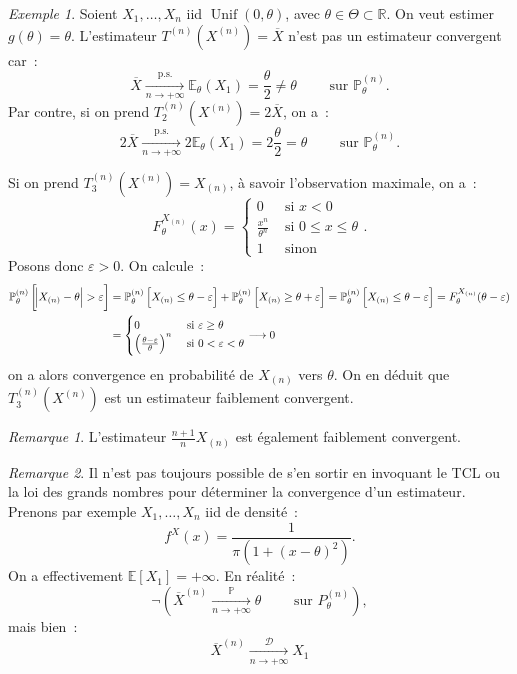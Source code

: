\documentclass{report}
\DeclareMathOperator{\Unif}{Unif}  %
\renewcommand{\P}{\mathbb P}
\newcommand{\E}{\mathbb E}
\newcommand{\pinfty}{{+\infty}}
\newcommand{\cvgp}{\xrightarrow[n \to \pinfty]{\P}}
\newcommand{\cvgd}{\xrightarrow[n \to \pinfty]{\mathcal D}}
\newcommand{\ps}{{\text{p.s.}}}
\newcommand{\cvgps}{\xrightarrow[n \to \pinfty]\ps}
\newcommand{\R}{\mathbb R}
\theoremstyle{definition}
\theoremstyle{remark}
\newtheorem*{rmq}{Remarque}
\newtheorem{ex}{Exemple}[chapter]
\begin{document}
			\begin{ex} Soient $X_1, \ldots, X_n$ iid $\Unif(0, \theta)$, avec $\theta \in \Theta \subset \R$. On veut estimer $g(\theta) = \theta$. L'estimateur
			$T^{(n)}(X^{(n)}) = \overline X$ n'est pas un estimateur convergent car~:
			\[\overline X \cvgps \E_\theta(X_1) = \frac \theta2 \neq \theta \qquad \text{ sur }\P_\theta^{(n)}.\]
			Par contre, si on prend $T_2^{(n)}(X^{(n)}) = 2\overline X$, on a~:
			\[2\overline X \cvgps 2\E_\theta(X_1) = 2\frac \theta2 = \theta \qquad \text{ sur }\P_\theta^{(n)}.\]

			Si on prend $T_3^{(n)}(X^{(n)}) = X_{(n)}$, à savoir l'observation maximale, on a~:
			\[F_\theta^{X_{(n)}}(x) = \begin{cases}0 &\text{ si }x < 0 \\\frac {x^n}{\theta^n} &\text{ si } 0 \leq x \leq \theta \\1 &\text{ sinon}\end{cases}.\]
			Posons donc $\varepsilon > 0$. On calcule~:
			\begin{align*}
				\P_\theta^{(n)}\left[\abs {X_{(n)} - \theta} > \varepsilon\right] &= \P_\theta^{(n)}\left[X_{(n)} \leq \theta - \varepsilon\right]
					+ \P_\theta^{(n)}\left[X_{(n)} \geq \theta + \varepsilon\right] = \P_\theta^{(n)}\left[X_{(n)} \leq \theta - \varepsilon\right]
					= F_\theta^{X_{(n)}}(\theta - \varepsilon) \\
				&=\begin{cases}0 &\text{ si }\varepsilon \geq \theta \\\left(\frac {\theta-\varepsilon}{\theta}\right)^n &\text{ si } 0 < \varepsilon < \theta\end{cases}
					\longrightarrow 0
			\end{align*}
			on a alors convergence en probabilité de $X_{(n)}$ vers $\theta$. On en déduit que $T_3^{(n)}(X^{(n)})$ est un estimateur faiblement convergent.
			\end{ex}

			\begin{rmq} L'estimateur $\frac {n+1}nX_{(n)}$ est également faiblement convergent.
			\end{rmq}

			\begin{rmq} Il n'est pas toujours possible de s'en sortir en invoquant le TCL ou la loi des grands nombres pour déterminer la convergence d'un estimateur.
			Prenons par exemple $X_1, \ldots, X_n$ iid de densité~:
			\[f^X(x) = \frac 1{\pi(1 + (x-\theta)^2)}.\]
			On a effectivement $\E[X_1] = \pinfty$. En réalité~:
			\[\lnot\left(\overline X^{(n)} \cvgp \theta \qquad \text{ sur } P_\theta^{(n)}\right),\]
			mais bien~:
			\[\overline X^{(n)} \cvgd X_1\]
			\end{rmq}
\end{document}
